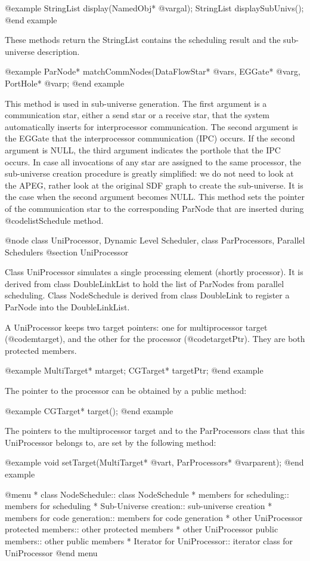 @example
StringList display(NamedObj* @var{gal});
StringList displaySubUnivs();
@end example

These methods return the StringList contains the scheduling result and
the sub-universe description.

@example
ParNode* matchCommNodes(DataFlowStar* @var{s}, EGGate* @var{g}, PortHole* @var{p};
@end example

This method is used in sub-universe generation. The first argument is a
communication star, either a send star or a receive star, that the
system automatically inserts for interprocessor communication.
The second argument is the EGGate that the interprocessor communication (IPC)
occurs. If the second argument is NULL, the third argument indicates
the porthole that the IPC occurs. In case all invocations of any star
are assigned to the same processor, the sub-universe creation procedure
is greatly simplified: we do not need to look at the APEG, rather look at
the original SDF graph to create the sub-universe. It is the case when
the second argument becomes NULL. This method sets the pointer of the
communication star to the corresponding ParNode that are inserted during
@code{listSchedule} method.

@node class UniProcessor, Dynamic Level Scheduler, class ParProcessors, Parallel Schedulers
@section UniProcessor

Class UniProcessor simulates a single processing element (shortly processor).
It is derived from class DoubleLinkList to hold the list of ParNodes
from parallel scheduling. Class NodeSchedule is derived from class
DoubleLink to register a ParNode into the DoubleLinkList.

A UniProcessor keeps two target pointers: one for multiprocessor target
(@code{mtarget}), and the other for the processor
(@code{targetPtr}). They are both protected members.

@example
MultiTarget* mtarget;
CGTarget* targetPtr;
@end example

The pointer to the processor can be obtained by a public method:

@example
CGTarget* target();
@end example

The pointers to the multiprocessor target and to the ParProcessors class
that this UniProcessor belongs to, are set by the following method:

@example
void setTarget(MultiTarget* @var{t}, ParProcessors* @var{parent});
@end example

@menu
* class NodeSchedule::				class NodeSchedule
* members for scheduling::			members for scheduling
* Sub-Universe creation::			sub-universe creation
* members for code generation::			members for code generation
* other UniProcessor protected members::	other protected members
* other UniProcessor public members::		other public members
* Iterator for UniProcessor::			iterator class for UniProcessor
@end menu

